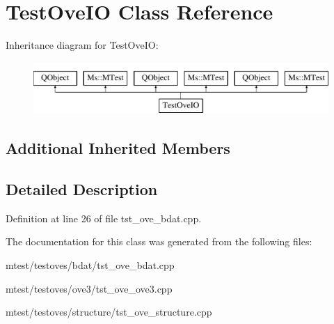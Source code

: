 \hypertarget{class_test_ove_i_o}{}\section{Test\+Ove\+IO Class Reference}
\label{class_test_ove_i_o}
Inheritance diagram for Test\+Ove\+IO\+:\begin{figure}[H]
\begin{center}
\leavevmode
\includegraphics[height=2.000000cm]{class_test_ove_i_o}
\end{center}
\end{figure}
\subsection*{Additional Inherited Members}


\subsection{Detailed Description}


Definition at line 26 of file tst\+\_\+ove\+\_\+bdat.\+cpp.



The documentation for this class was generated from the following files\+:\begin{DoxyCompactItemize}
\item 
mtest/testoves/bdat/tst\+\_\+ove\+\_\+bdat.\+cpp\item 
mtest/testoves/ove3/tst\+\_\+ove\+\_\+ove3.\+cpp\item 
mtest/testoves/structure/tst\+\_\+ove\+\_\+structure.\+cpp\end{DoxyCompactItemize}
